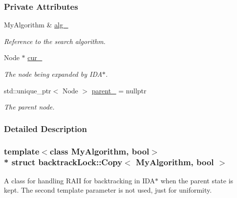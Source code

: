 \subsubsection*{Private Attributes}
\begin{DoxyCompactItemize}
\item 
My\+Algorithm \& \hyperlink{structbacktrackLock_1_1Copy_ae50942176fa6240ac51103253f3c9f1d}{alg\+\_\+}\hypertarget{structbacktrackLock_1_1Copy_ae50942176fa6240ac51103253f3c9f1d}{}\label{structbacktrackLock_1_1Copy_ae50942176fa6240ac51103253f3c9f1d}

\begin{DoxyCompactList}\small\item\em Reference to the search algorithm. \end{DoxyCompactList}\item 
Node $\ast$ \hyperlink{structbacktrackLock_1_1Copy_a92b47e6b4793fc27dfb6f1e1624c596c}{cur\+\_\+}\hypertarget{structbacktrackLock_1_1Copy_a92b47e6b4793fc27dfb6f1e1624c596c}{}\label{structbacktrackLock_1_1Copy_a92b47e6b4793fc27dfb6f1e1624c596c}

\begin{DoxyCompactList}\small\item\em The node being expanded by I\+D\+A$\ast$. \end{DoxyCompactList}\item 
std\+::unique\+\_\+ptr$<$ Node $>$ \hyperlink{structbacktrackLock_1_1Copy_aaf817503fe91301c4b2c951414950554}{parent\+\_\+} = nullptr\hypertarget{structbacktrackLock_1_1Copy_aaf817503fe91301c4b2c951414950554}{}\label{structbacktrackLock_1_1Copy_aaf817503fe91301c4b2c951414950554}

\begin{DoxyCompactList}\small\item\em The parent node. \end{DoxyCompactList}\end{DoxyCompactItemize}


\subsubsection{Detailed Description}
\subsubsection*{template$<$class My\+Algorithm, bool$>$\\*
struct backtrack\+Lock\+::\+Copy$<$ My\+Algorithm, bool $>$}

A class for handling R\+A\+II for backtracking in I\+D\+A$\ast$ when the parent state is kept. The second template parameter is not used, just for uniformity. 

